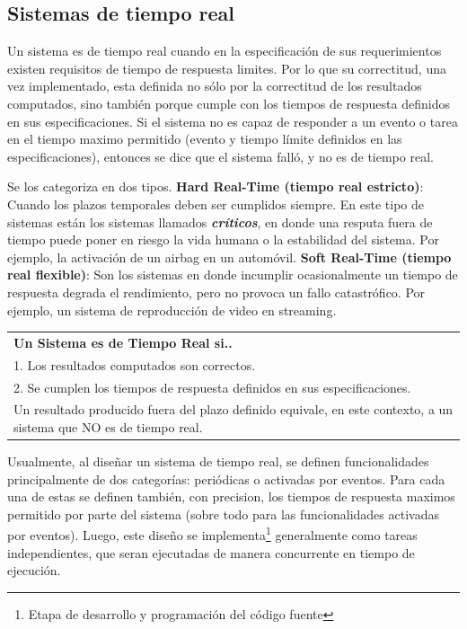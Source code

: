\documentclass[output=paper, 
colorlinks,
citecolor=brown,
newtxmath
]{langscibook}
\begin{document}
\subsection{Sistemas de tiempo real}
Un sistema es de tiempo real cuando en la especificación de sus requerimientos
existen requisitos de tiempo de respuesta limites.
Por lo que su correctitud, una vez implementado, esta definida no sólo 
por la correctitud de los resultados computados, sino también porque cumple con los tiempos de respuesta definidos en sus especificaciones. Si el sistema no 
es capaz de responder a un evento o tarea en el tiempo maximo permitido (evento y tiempo límite definidos en las especificaciones), entonces se dice que el sistema falló, y no es de tiempo real.

Se los categoriza en dos tipos. \textbf{Hard Real-Time (tiempo real estricto)}: Cuando los plazos temporales deben ser cumplidos siempre. En este tipo de sistemas están los sistemas llamados \textit{\textbf{críticos}}, en donde una resputa fuera de tiempo puede poner en riesgo la vida humana o la estabilidad del sistema. Por ejemplo, la activación de un airbag en un automóvil.  \textbf{Soft Real-Time (tiempo real flexible)}: Son los sistemas en donde incumplir ocasionalmente un tiempo de respuesta degrada el rendimiento, pero no provoca un fallo catastrófico. Por ejemplo, un sistema de reproducción de video en streaming.

\begin{center}
\begin{tabularx}{\textwidth}{|X|}
\rowcolor{aliceblue}
\textbf{Un Sistema es de Tiempo Real si..}\\
  1.  Los resultados computados son correctos. \\
  2.  Se cumplen los tiempos de respuesta definidos en sus especificaciones. \\
Un resultado producido fuera del plazo definido equivale, en este contexto, a un sistema que NO es de tiempo real.
\end{tabularx}
\end{center}


Usualmente, al diseñar un sistema de tiempo real, se definen funcionalidades
principalmente de dos categorías: periódicas o activadas por eventos. 
Para cada una de estas se definen también, con precision, los tiempos de respuesta maximos permitido por parte del sistema (sobre todo para las funcionalidades
activadas por eventos). Luego, este diseño se implementa\footnote{Etapa de desarrollo y programación del código fuente} generalmente como tareas independientes, que seran ejecutadas de manera concurrente en tiempo de ejecución. 
\end{document}
